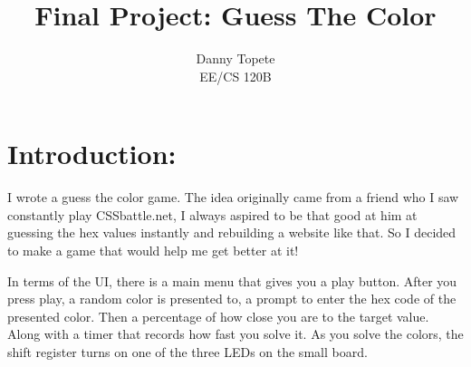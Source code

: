 \documentclass[12pt]{article}
\begin{document}
 
 
\title{Final Project: Guess The Color}
\author{Danny Topete\\ %
EE/CS 120B}

\maketitle

\doublespacing

\section{Introduction:}
I wrote a guess the color game. The idea originally came from a friend who I saw constantly play CSSbattle.net,
I always aspired to be that good at him at guessing the hex values instantly and rebuilding a website like that.
So I decided to make a game that would help me get better at it! 

In terms of the UI, there is a main menu that gives you a play button. After you press play,
a random color is presented to, a prompt to enter the 
hex code of the presented color. Then a percentage
of how close you are to the target value. Along with
a timer that records how fast you solve it.
As you solve the colors, the shift register turns on one of the
three LEDs on the small board.
\pagebreak
\end{document}
